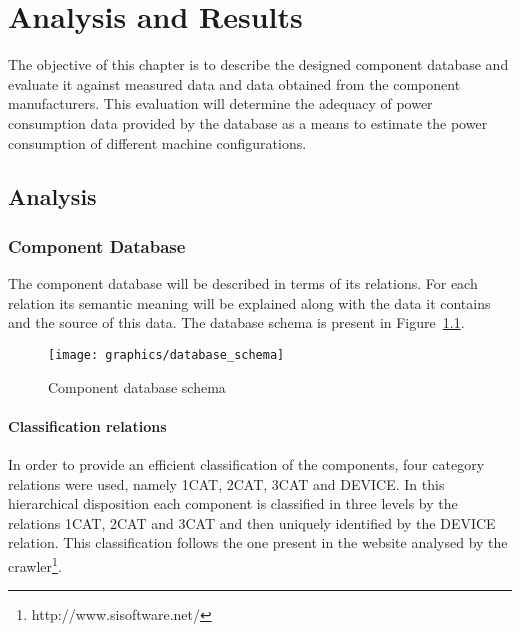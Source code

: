 

\chapter{Analysis and Results} \label{chap4:analysis_results}
%
    The objective of this chapter is to describe the designed component database and evaluate it against measured data and data obtained from the component manufacturers. This evaluation will determine the adequacy of power consumption data provided by the database as a means to estimate the power consumption of different machine configurations.
\section{Analysis} \label{sec4:analysis}
\subsection{Component Database} \label{sec4:component_database}
    The component database will be described in terms of its relations. For each relation its semantic meaning will be explained along with the data it contains and the source of this data. The database schema is present in Figure~\ref{fig:database_schema}.

    \begin{figure}[h!tb]
        \centering
        \texttt{[image: graphics/database\_schema]}
        \caption{Component database schema}
        \label{fig:database_schema}
    \end{figure}
    \subsubsection*{Classification relations}
        In order to provide an efficient classification of the components, four category relations were used, namely 1CAT, 2CAT, 3CAT and DEVICE. In this hierarchical disposition each component is classified in three levels by the relations 1CAT, 2CAT and 3CAT and then uniquely identified by the DEVICE relation. This classification follows the one present in the website analysed by the crawler\footnote{http://www.sisoftware.net/}.

